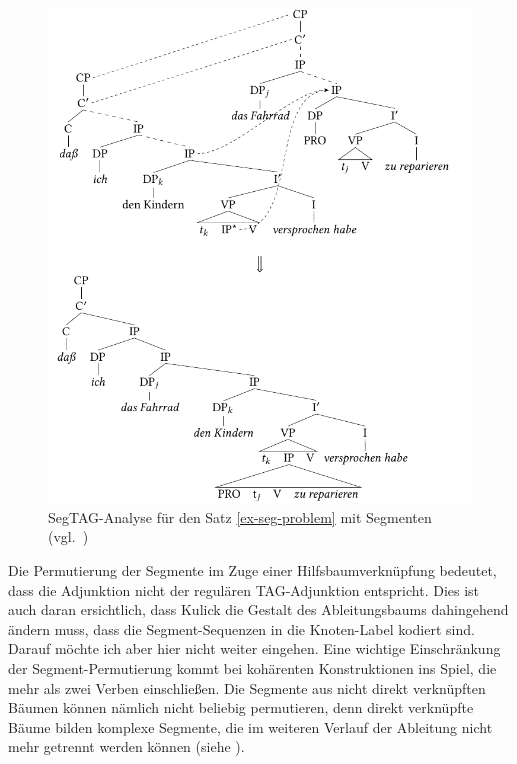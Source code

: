 \begin{figure}[p] 
\centering
\includegraphics{graphics/abb614.pdf}
\caption{SegTAG-Analyse für den Satz \ref{ex-seg-problem} mit Segmenten (vgl.\ \citealt[(159), (160)]{Kulick:00})\label{fig-seg-ling2}}
\end{figure}

Die Permutierung der Segmente im Zuge einer Hilfsbaumverknüpfung bedeutet, dass die Adjunktion nicht der regulären TAG-Adjunktion entspricht. Dies ist auch daran ersichtlich, dass Kulick die Gestalt des Ableitungsbaums dahingehend ändern muss, dass die Segment-Sequenzen in die Knoten-Label kodiert sind. Darauf möchte ich aber hier nicht weiter eingehen. Eine wichtige Einschränkung der Segment-Permutierung kommt bei kohärenten Konstruktionen ins Spiel, die mehr als zwei Verben einschlie\ss en. Die Segmente aus nicht direkt verknüpften Bäumen können nämlich nicht beliebig permutieren, denn direkt verknüpfte Bäume bilden komplexe Segmente, die im weiteren Verlauf der Ableitung nicht mehr getrennt werden können (siehe \citealt[213ff]{Kulick:00}).

